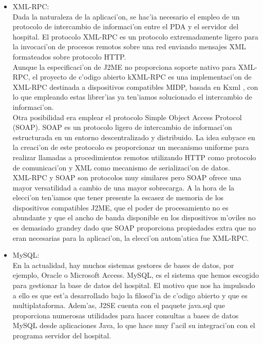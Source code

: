 \begin{itemize}
\item XML-RPC:\bigskip \\Dada la naturaleza de la aplicaci'on, se hac'ia necesario el empleo de un protocolo de intercambio de informaci'on entre el PDA y el servidor del hospital. El protocolo XML-RPC es un protocolo extremadamente ligero para la invocaci'on de procesos remotos sobre una red enviando mensajes XML formateados sobre protocolo HTTP. \bigskip \\Aunque la especificaci'on de J2ME no proporciona soporte nativo para XML-RPC, el proyecto de c'odigo abierto kXML-RPC es una implementaci'on de XML-RPC destinada a dispositivos compatibles MIDP, basada en Kxml , con lo que empleando estas librer'ias ya ten'iamos solucionado el intercambio de informaci'on.\bigskip \\Otra posibilidad era emplear el protocolo Simple Object Access Protocol (SOAP). SOAP es un protocolo ligero de intercambio de informaci'on estructurada en un entorno descentralizado y distribuido. La idea subyace en la creaci'on de este protocolo es proporcionar un mecanismo uniforme para realizar llamadas a procedimientos remotos utilizando HTTP como protocolo de comunicaci'on y XML  como mecanismo de serializaci'on de datos.\bigskip \\XML-RPC y SOAP son protocolos muy similares pero SOAP ofrece una mayor versatilidad a cambio de una mayor sobrecarga. A la hora de la elecci'on ten'iamos que tener presente la escasez de memoria de los dispositivos compatibles J2ME, que el poder de procesamiento no es abundante y que el ancho de banda disponible en los dispositivos m'oviles no es demasiado grandey dado que SOAP proporciona propiedades extra que no eran necesarias para la aplicaci'on, la elecci'on autom'atica fue XML-RPC.

\item MySQL:\bigskip \\En la actualidad, hay muchos sistemas gestores de bases de datos, por ejemplo, Oracle o Microsoft Access. MySQL, es el sistema que hemos escogido para gestionar la base de datos del hospital. El motivo que nos ha impulsado a ello es que est'a desarrollado bajo la filosof'ia de c'odigo abierto y que es multiplataforma. Adem'as, J2SE cuenta con el paquete java.sql que proporciona numerosas utilidades para hacer consultas a bases de datos MySQL desde aplicaciones Java, lo que hace muy f'acil su integraci'on con el programa servidor del hospital.
\end{itemize}